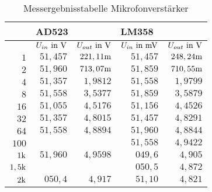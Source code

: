 \begin{table}[H]
\centering
\caption{Messergebnisstabelle Mikrofonverstärker}
\label{tab:Mikrofon_erg_tab}
\begin{tabular}{r||r|r||r|r|}
\cline{2-5}
                                                & \multicolumn{2}{l||}{AD523} & \multicolumn{2}{l|}{LM358} \\ \hline
\rowcolor[HTML]{C0C0C0} 
\multicolumn{1}{|r||}{\cellcolor[HTML]{C0C0C0}$f\text{ in }\Hz$} &$ U_{in}\text{ in }\text{V}       $&$ U_{out}\text{ in }\text{V}     $&$ U_{in}\text{ in }\text{mV}        $&$ U_{out}\text{ in }\text{V}   $\\ \hline
\multicolumn{1}{|r||}{$1$}                         &$ 51,457    $&$ 221,11\text{m}   $&$ 51,457   $&$ 248,24\text{m}    $\\ \hline
\multicolumn{1}{|r||}{$2$}                         &$ 51,960    $&$ 713,07\text{m}   $&$ 51,859   $&$ 710,55\text{m}    $\\ \hline
\multicolumn{1}{|r||}{$4$}                         &$ 51,357    $&$ 1,9812      $&$ 51,558   $&$ 1,9799       $\\ \hline
\multicolumn{1}{|r||}{$8$}                         &$ 51,558    $&$ 3,5377      $&$ 51,859   $&$ 3,5879       $\\ \hline
\multicolumn{1}{|r||}{$16$}                        &$ 51,055    $&$ 4,5176      $&$ 51,156   $&$ 4,4526       $\\ \hline
\multicolumn{1}{|r||}{$32$}                        &$ 51,357    $&$ 4,8015      $&$ 51,457   $&$ 4,8291       $\\ \hline
\multicolumn{1}{|r||}{$64$}                        &$ 51,558    $&$ 4,8894      $&$ 51,960   $&$ 4,8844       $\\ \hline
\multicolumn{1}{|r||}{$100$}                       &$              $&$             $&$ 51,558   $&$ 4,9422       $\\ \hline
\multicolumn{1}{|r||}{$1\text{k}$}                       &$ 51,960    $&$ 4,9598      $&$ 049,6    $&$ 4,905        $\\ \hline
\multicolumn{1}{|r||}{$1,5\text{k}$}                     &$              $&$             $&$ 050,5    $&$ 4,872        $\\ \hline
\multicolumn{1}{|r||}{$2\text{k}$}                       &$ 050,4     $&$ 4,917       $&$ 51,10    $&$ 4,821        $\\ \hline

\end{tabular}
\end{table}
